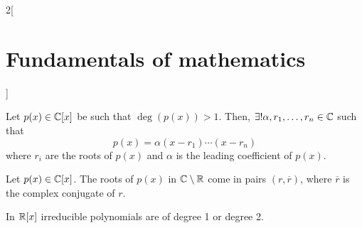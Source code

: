 \documentclass[../../../main_math.tex]{subfiles}
\begin{document}
\begin{multicols}{2}[\section{Fundamentals of mathematics}]
\begin{theorem}
  \end{theorem}
  \begin{corollary}
    Let $p(x)\in\mathbb{C}[x]$ be such that $\deg(p(x))>1$. Then, $\exists!\alpha,r_1,\ldots,r_n\in\mathbb{C}$ such that $$p(x)=\alpha(x-r_1)\cdots(x-r_n)$$ where $r_i$ are the roots of $p(x)$ and $\alpha$ is the leading coefficient of $p(x)$.
  \end{corollary}
  \begin{corollary}
    Let $p(x)\in\mathbb{C}[x]$. The roots of $p(x)$ in $\mathbb{C}\setminus\mathbb{R}$ come in pairs $(r,\overline{r})$, where $\overline{r}$ is the complex conjugate of $r$.
  \end{corollary}
  \begin{theorem}
    In $\mathbb{R}[x]$ irreducible polynomials are of degree 1 or degree 2.
  \end{theorem}
\end{multicols}
\end{document}
